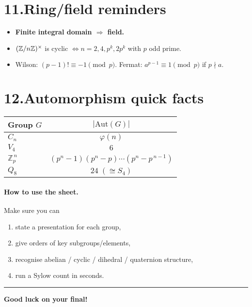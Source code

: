 \documentclass[12pt]{article}
\theoremstyle{definition} %
\theoremstyle{plain} %
\begin{document}
  \bigskip
  \section*{11.\;Ring/field reminders}
  
  \begin{itemize}
    \item \textbf{Finite integral domain $\Rightarrow$ field.}
    \item $(\Bbb Z/n\Bbb Z)^{\times}$ is cyclic $\iff n=2,4,p^{k},2p^{k}$ with $p$ odd prime.
    \item Wilson: $(p-1)!\equiv-1\pmod p$. \quad
          Fermat: $a^{p-1}\equiv1\pmod p$ if $p\nmid a$.
  \end{itemize}
  
  \bigskip
  \section*{12.\;Automorphism quick facts}
  
  \begin{tabular}{|l|c|}
  \hline
  Group $G$ & $|\mathrm{Aut}(G)|$ \\\hline
  $C_{n}$                & $\varphi(n)$\\
  $V_{4}$                & $6$\\
  $\mathbb{Z}_{p}^{\,n}$         & $(p^{n}-1)(p^{n}-p)\cdots(p^{n}-p^{\,n-1})$\\
  $Q_{8}$                & $24\;(\cong S_{4})$\\\hline
  \end{tabular}
  
  \bigskip
  \paragraph{How to use the sheet.}
  Make sure you can
  \begin{enumerate}
    \item state a presentation for each group,
    \item give orders of key subgroups/elements,
    \item recognise abelian / cyclic / dihedral / quaternion structure,
    \item run a Sylow count in seconds.
  \end{enumerate}
  
  \medskip
  \hrule
  \medskip
  \centerline{\textbf{Good luck on your final!}}
\end{document}
